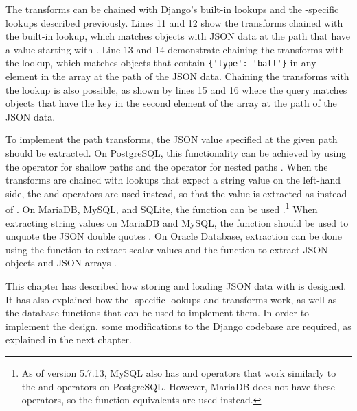 The transforms can be chained with Django's built-in lookups and the
-specific lookups described previously. Lines 11 and 12 show
the transforms chained with the built-in  lookup, which
matches objects with JSON data at the path  that have a value
starting with . Line 13 and 14 demonstrate chaining the transforms
with the  lookup, which matches objects that contain
\verb|{'type': 'ball'}| in any element in the array at the path
 of the JSON data. Chaining the transforms with the
 lookup is also possible, as shown by lines 15 and 16 where the
query matches objects that have the key  in the second element of
the array at the  path of the JSON data.

To implement the path transforms, the JSON value specified at the given path
should be extracted. On PostgreSQL, this functionality can be achieved by using
the \code{->} operator for shallow paths and the \code{\#>} operator for nested
paths \cite{postgres:json_operators}. When the transforms are chained with
lookups that expect a string value on the left-hand side, the \code{->>} and
\code{\#>>} operators are used instead, so that the value is extracted as
 instead of . On MariaDB, MySQL, and SQLite, the
 function can be used \cite{mariadb:json_extract,
mysql:json_search, sqlite:json1}.\footnote{As of version 5.7.13, MySQL also has
\code{->} and \code{->>} operators that work similarly to the \code{\#>} and
\code{\#>>} operators on PostgreSQL. However, MariaDB does not have these
operators, so the function equivalents are used instead.} When extracting
string values on MariaDB and MySQL, the  function should be
used to unquote the JSON double quotes \cite{mariadb:json_unquote,
mysql:json_modify}. On Oracle Database, extraction can be done using the
 function to extract scalar values and the 
function to extract JSON objects and JSON arrays \cite{oracle:json_value,
oracle:json_query}.

This chapter has described how storing and loading JSON data with
 is designed. It has also explained how the
-specific lookups and transforms work, as well as the database
functions that can be used to implement them. In order to implement the design,
some modifications to the Django codebase are required, as explained in the
next chapter.
